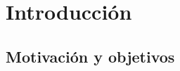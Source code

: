 \chapter{Introducción}

\section{ Motivación y objetivos}
\cite{Yo,multiple,cambon1,schaffer,saha,bintu2005transcriptional,parker2011cis,meijer2012numerical}